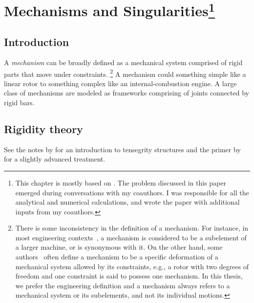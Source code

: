
\chapter[Mechanisms and Singularities]{Mechanisms and Singularities\footnote{%
  This chapter is mostly based on .
  The problem discussed in this paper emerged during conversations with my coauthors.
  I was responsible for all the analytical and numerical calculations, and wrote the paper with additional inputs from my coauthors.
}}


\section{Introduction}

A \emph{mechanism} can be broadly defined as a mechanical system comprised of rigid parts that move under constraints.%
\footnote{There is some inconsistency in the definition of a mechanism.
  For instance, in most engineering contexts~\cite{hartenberg1964,hunt1978,myszka2012}, a mechanism is considered to be a subelement of a larger machine, or is synonymous with it.
  On the other hand, some authors~\cite{connelly2022} often define a mechanism to be a specific deformation of a mechanical system allowed by its constraints, e.g., a rotor with two degrees of freedom and one constraint is said to possess one mechanism.
  In this thesis, we prefer the engineering definition and a mechanism always refers to a mechanical system or its subelements, and not its individual motions.}
A mechanism could something simple like a linear rotor to something complex like an internal-combustion engine.
A large class of mechanisms are modeled as frameworks comprising of joints connected by rigid bars.

\section{Rigidity theory}

See the notes by \citet{connelly2022} for an introduction to tensegrity structures and the primer by \citet{williams2003} for a slightly advanced treatment.


